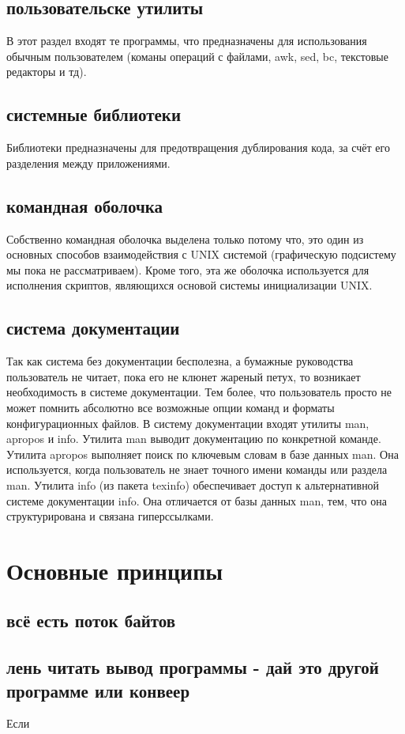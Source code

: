 \subsection{пользовательске утилиты}
В этот раздел входят те программы, что предназначены для использования обычным пользователем (команы операций с файлами, awk, sed, bc, текстовые редакторы и тд).
\subsection{системные библиотеки}
Библиотеки предназначены для предотвращения дублирования кода, за счёт его разделения между приложениями.
\subsection{командная оболочка}
Собственно командная оболочка выделена только потому что, это один из основных способов взаимодействия с UNIX системой (графическую подсистему мы пока не рассматриваем). Кроме того, эта же оболочка используется для исполнения скриптов, являющихся основой системы инициализации UNIX.
\subsection{система документации}
Так как система без документации бесполезна, а бумажные руководства пользователь не читает, пока его не клюнет жареный петух, то возникает необходимость в системе документации. Тем более, что пользователь просто не может помнить абсолютно все возможные опции команд и форматы конфигурационных файлов.
В систему документации входят утилиты man, apropos и info.
Утилита man выводит документацию по конкретной команде.
Утилита apropos выполняет поиск по ключевым словам в базе данных man. Она используется, когда пользователь не знает точного имени команды или раздела man.
Утилита info (из пакета texinfo) обеспечивает доступ к альтернативной системе документации info. Она отличается от базы данных man, тем, что она структурирована и связана гиперссылками.
\section {Основные принципы}
\subsection{всё есть поток байтов}
\subsection{лень читать вывод программы - дай это другой программе или конвеер}
Если 
